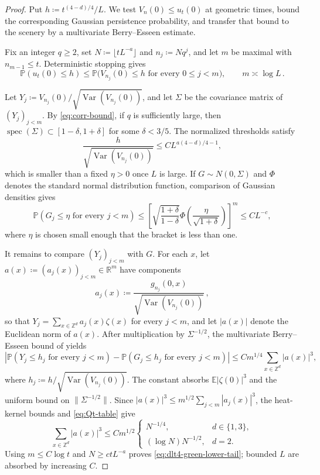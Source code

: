 \documentclass[11pt]{amsart}
\theoremstyle{plain}
\theoremstyle{definition}
\newcommand{\Z}{\mathbb{Z}}
\newcommand{\R}{\mathbb{R}}
\newcommand{\E}{\mathbb{E}}
\renewcommand{\P}{\mathbb{P}}
\DeclareMathOperator{\Var}{Var}
\begin{document}
\begin{proof}
	Put $h\coloneqq t^{(4-d)/4}/L$. We test $V_n(0)\leq u_t(0)$ at
	geometric times, bound the corresponding Gaussian persistence probability,
	and transfer that bound to the scenery by a multivariate Berry--Esseen
	estimate.

	Fix an integer $q\geq2$, set $N\coloneqq\lfloor tL^{-a}\rfloor$ and
	$n_j\coloneqq Nq^j$, and let $m$ be maximal with $n_{m-1}\leq t$.
	Deterministic stopping gives
	\[
		\P(u_t(0)\leq h)
		\leq\P\bigl(V_{n_j}(0)\leq h\text{ for every }0\leq j<m\bigr),
		\qquad m\asymp\log L\, .
	\]

	Let $Y_j\coloneqq V_{n_j}(0)/\sqrt{\Var(V_{n_j}(0))}$, and let $\Sigma$
	be the covariance matrix of $(Y_j)_{j<m}$. By \eqref{eq:corr-bound}, if
	$q$ is sufficiently large, then
	$\operatorname{spec}(\Sigma)\subset[1-\delta,1+\delta]$ for some
	$\delta<3/5$. The normalized thresholds satisfy
	\[
		\frac{h}{\sqrt{\Var(V_{n_j}(0))}}
		\leq C L^{a(4-d)/4-1},
	\]
	which is smaller than a fixed $\eta>0$ once $L$ is large. If
	$G\sim N(0,\Sigma)$ and $\Phi$ denotes the standard normal distribution
	function, comparison of Gaussian densities gives
	\[
		\P(G_j\leq\eta\text{ for every }j<m)
		\leq\left[
		\sqrt{\frac{1+\delta}{1-\delta}}
		\Phi\left(\frac{\eta}{\sqrt{1+\delta}}\right)
		\right]^m
		\leq CL^{-c},
	\]
	where $\eta$ is chosen small enough that the bracket is less than one.

	It remains to compare $(Y_j)_{j<m}$ with $G$. For each $x$, let $a(x)\coloneqq(a_j(x))_{j<m}\in\R^m$ have components
	\[
		a_j(x)\coloneqq
		\frac{g_{n_j}(0,x)}{\sqrt{\Var(V_{n_j}(0))}}\, ,
	\]
	so that $Y_j=\sum_{x\in\Z^d}a_j(x)\zeta(x)$ for every $j<m$, and let $|a(x)|$ denote the Euclidean norm of $a(x)$.
	After multiplication by $\Sigma^{-1/2}$, the multivariate Berry--Esseen
	bound of \citet[Theorem~1.1]{Raic} yields
	\[
		\left|\P(Y_j\leq h_j\text{ for every }j<m)
		-\P(G_j\leq h_j\text{ for every }j<m)\right|
		\leq Cm^{1/4}\sum_{x\in\Z^d}|a(x)|^3,
	\]
	where $h_j\coloneqq h/\sqrt{\Var(V_{n_j}(0))}$.
	The constant absorbs $\E|\zeta(0)|^3$ and the uniform bound on
	$\|\Sigma^{-1/2}\|$.
	Since $|a(x)|^3\leq m^{1/2}\sum_{j<m}|a_j(x)|^3$, the heat-kernel bounds
	and \eqref{eq:Qt-table} give
	\[
		\sum_{x\in\Z^d}|a(x)|^3
		\leq Cm^{1/2}
		\begin{cases}
			N^{-1/4},&d\in\{1,3\},\\
			(\log N)N^{-1/2},&d=2.
		\end{cases}
	\]
	Using $m\leq C\log t$ and $N\geq ctL^{-a}$ proves
	\eqref{eq:dlt4-green-lower-tail}; bounded $L$ are absorbed by increasing
	$C$.
\end{proof}
\end{document}
